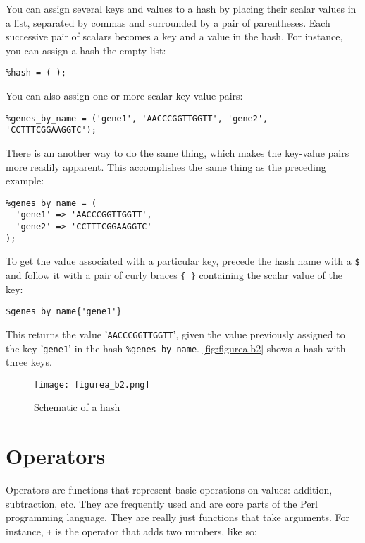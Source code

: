 You can assign several keys and values to a hash by placing their scalar values in a list, separated by commas and surrounded by a pair of parentheses. Each successive pair of scalars becomes a key and a value in the hash. For instance, you can assign a hash the empty list:

\begin{lstlisting}
%hash = ( );
\end{lstlisting}

You can also assign one or more scalar key-value pairs:

\begin{lstlisting}
%genes_by_name = ('gene1', 'AACCCGGTTGGTT', 'gene2', 'CCTTTCGGAAGGTC');
\end{lstlisting}

There is an another way to do the same thing, which makes the key-value pairs more readily apparent. This accomplishes the same thing as the preceding example:

\begin{lstlisting}
%genes_by_name = (
  'gene1' => 'AACCCGGTTGGTT',
  'gene2' => 'CCTTTCGGAAGGTC'
);
\end{lstlisting}

To get the value associated with a particular key, precede the hash name with a \verb|$| and follow it with a pair of curly braces \verb|{ }| containing the scalar value of the key:

\begin{lstlisting}
$genes_by_name{'gene1'}
\end{lstlisting}

This returns the value '\verb|AACCCGGTTGGTT|', given the value previously assigned to the key '\verb|gene1|' in the hash \verb|%genes_by_name|. \autoref{fig:figurea.b2} shows a hash with three keys.

\begin{figure}
  \centering
  \texttt{[image: figurea\_b2.png]}
  \caption{Schematic of a hash}
  \label{fig:figurea.b2}
 \end{figure}{}

\section{Operators}
Operators are functions that represent basic operations on values: addition, subtraction, etc. They are frequently used and are core parts of the Perl programming language. They are really just functions that take arguments. For instance, \verb|+| is the operator that adds two numbers, like so:

